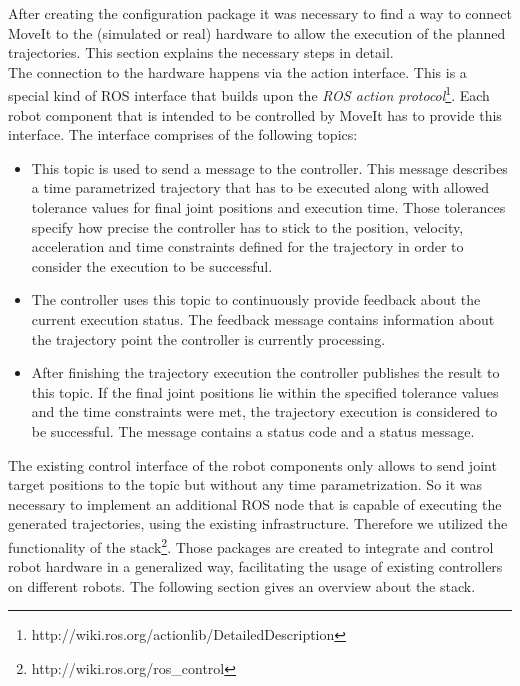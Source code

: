 After creating the configuration package it was necessary to find a way to connect MoveIt to the (simulated or real) hardware to allow the execution of the planned trajectories. This section explains the necessary steps in detail. \\

The connection to the hardware happens via the  action interface. This is a special kind of ROS interface that builds upon the \emph{ROS action protocol}\footnote{http://wiki.ros.org/actionlib/DetailedDescription}. Each robot component that is intended to be controlled by MoveIt has to provide this interface. The interface comprises of the following topics:
\begin{itemize}

\item {}

This topic is used to send a  message to the controller. This message describes a time parametrized trajectory that has to be executed along with allowed tolerance values for final joint positions and execution time. Those tolerances specify how precise the controller has to stick to the position, velocity, acceleration and time constraints defined for the trajectory in order to consider the execution to be successful.

\item {}

The controller uses this topic to continuously provide feedback about the current execution status. The feedback message contains information about the trajectory point the controller is currently processing.

\item {}

After finishing the trajectory execution the controller publishes the result to this topic. If the final joint positions lie within the specified tolerance values and the time constraints were met, the trajectory execution is considered to be successful. The message contains a status code and a status message.

\end{itemize}
The existing control interface of the robot components only allows to send joint target positions to the  topic but without any time parametrization. So it was necessary to implement an additional ROS node that is capable of executing the generated trajectories, using the existing infrastructure. Therefore we utilized the functionality of the  stack\footnote{http://wiki.ros.org/ros\_control}. Those packages are created to integrate and control robot hardware in a generalized way, facilitating the usage of existing controllers on different robots. The following section gives an overview about the  stack.

